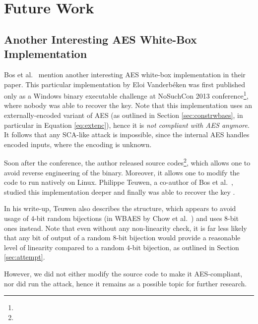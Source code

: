 \chapter{Future Work}
\label{chap:future}

\section{Another Interesting AES White-Box Implementation}
\label{sec:magicimpl}

Bos et al.\ \cite{bos2015differential} mention another interesting AES white-box implementation in their paper. This particular implementation by Eloi Vanderbéken was first published only as a Windows binary executable challenge at NoSuchCon 2013 conference\footnote{}, where nobody was able to recover the key. Note that this implementation uses an externally-encoded variant of AES (as outlined in Section \ref{sec:constrwbaes}, in particular in Equation \ref{eq:extenc}), hence it is {\em not compliant with AES anymore}. It follows that any SCA-like attack is impossible, since the internal AES handles encoded inputs, where the encoding is unknown.

Soon after the conference, the author released source codes\footnote{}, which allows one to avoid reverse engineering of the binary. Moreover, it allows one to modify the code to run natively on Linux. Philippe Teuwen, a co-author of Bos et al.\ \cite{bos2015differential}, studied this implementation deeper and finally was able to recover the key \cite{teuwen2015nscwriteups}.

In his write-up, Teuwen also describes the structure, which appears to avoid usage of $4$-bit random bijections (in WBAES by Chow et al.\ \cite{chow2002aes}) and uses $8$-bit ones instead. Note that even without any non-linearity check, it is far less likely that any bit of output of a random $8$-bit bijection would provide a reasonable level of linearity compared to a random $4$-bit bijection, as outlined in Section \ref{sec:attempt}.

However, we did not either modify the source code to make it AES-compliant, nor did run the attack, hence it remains as a possible topic for further research.

